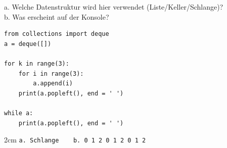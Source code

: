 \question[2]
a. Welche Datenstruktur wird hier verwendet (Liste/Keller/Schlange)? \\
b. Was erscheint auf der Konsole?
 
\begin{lstlisting}
from collections import deque
a = deque([]) 

for k in range(3):
    for i in range(3):
        a.append(i)
    print(a.popleft(), end = ' ')

while a:
    print(a.popleft(), end = ' ')
\end{lstlisting}

\begin{solutionbox}{2cm}
\texttt{a. Schlange  ~~  b. 0 1 2 0 1 2 0 1 2 } 
\end{solutionbox}
